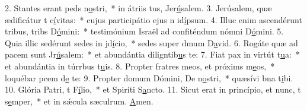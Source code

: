 2. Stantes erant peds n\uline{o}stri,~* in átriis tus, Jer\uline{ú}salem.
3. Jerúsalem, quæ ædificátur t c\uline{í}vitas:~* cujus participátio ejus n id\uline{í}psum.
4. Illuc enim ascendérunt tribus, tribs D\uline{ó}mini:~* testimónium Israël ad confiténdum nómni D\uline{ó}mini.
5. Quia illic sedérunt sedes in jd\uline{í}cio,~* sedes super dmum D\uline{a}vid.
6. Rogáte quæ ad pacem sunt Jr\uline{ú}salem:~* et abundántia diligntib\uline{u}s te:
7. Fiat pax in virtút t\uline{u}a:~* et abundántia in túrrbus t\uline{u}is.
8. Propter fratres meos, et próxims m\uline{e}os,~* loquébar pcem d\uline{e} te:
9. Propter domum Dómini, De n\uline{o}stri,~* quæsívi bna t\uline{i}bi.
10. Glória Patri, t F\uline{í}lio,~* et Spiríti S\uline{a}ncto.
11. Sicut erat in princípio, et nunc, t s\uline{e}mper,~* et in sǽcula sæculrum. \uline{A}men.
